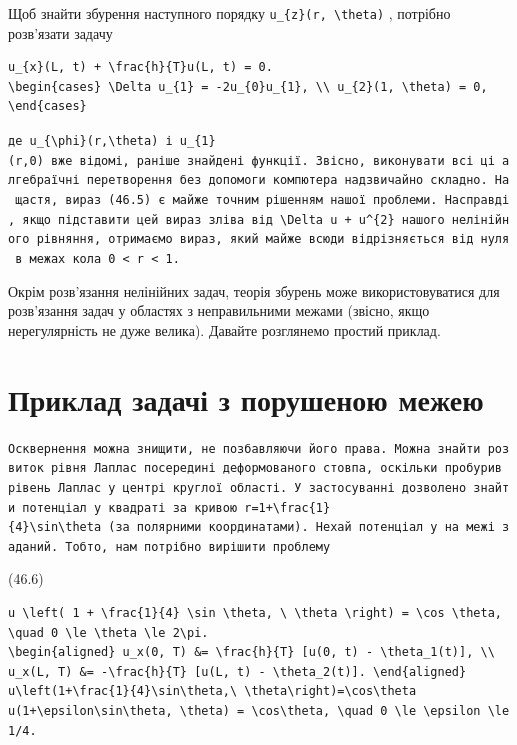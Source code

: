 \documentclass[
  ukrainian,
]{article}
\begin{document}
Щоб знайти збурення наступного порядку
\texttt{u\_\{z\}(r,\ \textbackslash{}theta)} , потрібно розв'язати
задачу

\begin{verbatim}
u_{x}(L, t) + \frac{h}{T}u(L, t) = 0.
\begin{cases} \Delta u_{1} = -2u_{0}u_{1}, \\ u_{2}(1, \theta) = 0, \end{cases}
\end{verbatim}

\texttt{де\ \textquotesingle{}u\_\{\textbackslash{}phi\}(r,\textbackslash{}theta)\textquotesingle{}\ і\ \textquotesingle{}u\_\{1\}(r,0)\textquotesingle{}\ вже\ відомі,\ раніше\ знайдені\ функції.\ Звісно,\ виконувати\ всі\ ці\ алгебраїчні\ перетворення\ без\ допомоги\ комп\textquotesingle{}ютера\ надзвичайно\ складно.\ На\ щастя,\ вираз\ (46.5)\ є\ майже\ точним\ рішенням\ нашої\ проблеми.\ Насправді,\ якщо\ підставити\ цей\ вираз\ зліва\ від\ \textquotesingle{}\textbackslash{}Delta\ u\ +\ u\^{}\{2\}\textquotesingle{}\ нашого\ нелінійного\ рівняння,\ отримаємо\ вираз,\ який\ майже\ всюди\ відрізняється\ від\ нуля\ в\ межах\ кола\ 0\ \textless{}\ r\ \textless{}\ 1.}

Окрім розв'язання нелінійних задач, теорія збурень може
використовуватися для розв'язання задач у областях з неправильними
межами (звісно, якщо нерегулярність не дуже велика). Давайте розглянемо
простий приклад.

\section{Приклад задачі з порушеною
межею}\label{ux43fux440ux438ux43aux43bux430ux434-ux437ux430ux434ux430ux447ux456-ux437-ux43fux43eux440ux443ux448ux435ux43dux43eux44e-ux43cux435ux436ux435ux44e}

\texttt{Осквернення\ можна\ знищити,\ не\ позбавляючи\ його\ права.\ Можна\ знайти\ розвиток\ рівня\ Лаплас\ посередині\ деформованого\ стовпа,\ оскільки\ пробурив\ рівень\ Лаплас\ у\ центрі\ круглої\ області.\ У\ застосуванні\ дозволено\ знайти\ потенціал\ у\ квадраті\ за\ кривою\ \textquotesingle{}r=1+\textbackslash{}frac\{1\}\{4\}\textbackslash{}sin\textbackslash{}theta\textquotesingle{}\ (за\ полярними\ координатами).\ Нехай\ потенціал\ у\ на\ межі\ заданий.\ Тобто,\ нам\ потрібно\ вирішити\ проблему}

(46.6)

\begin{verbatim}
u \left( 1 + \frac{1}{4} \sin \theta, \ \theta \right) = \cos \theta, \quad 0 \le \theta \le 2\pi.
\begin{aligned} u_x(0, T) &= \frac{h}{T} [u(0, t) - \theta_1(t)], \\ u_x(L, T) &= -\frac{h}{T} [u(L, t) - \theta_2(t)]. \end{aligned}
u\left(1+\frac{1}{4}\sin\theta,\ \theta\right)=\cos\theta
u(1+\epsilon\sin\theta, \theta) = \cos\theta, \quad 0 \le \epsilon \le 1/4.
\end{verbatim}
\end{document}
